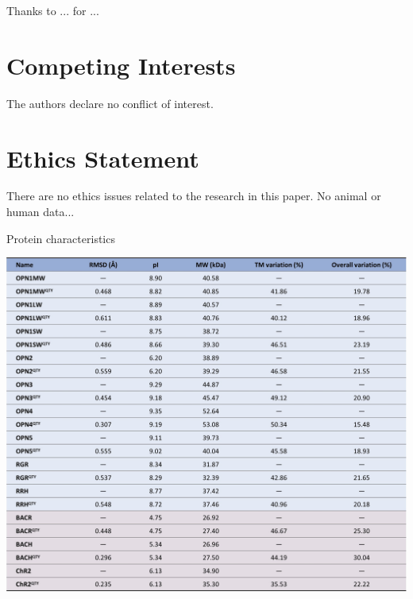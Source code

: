\documentclass[fleqn,10pt,lineno]{manuscript}
\begin{document}
Thanks to ... for ...


\section*{Competing Interests}

The authors declare no conflict of interest.


\section*{Ethics Statement}

There are no ethics issues related to the research in this paper. No animal or human data...




\begin{table}[h]
	\centering
	\caption{Protein characteristics}
	\label{tb:characteristics}
	\includegraphics[width=\linewidth]{Figures/characteristics.jpg}
\end{table}
\end{document}
